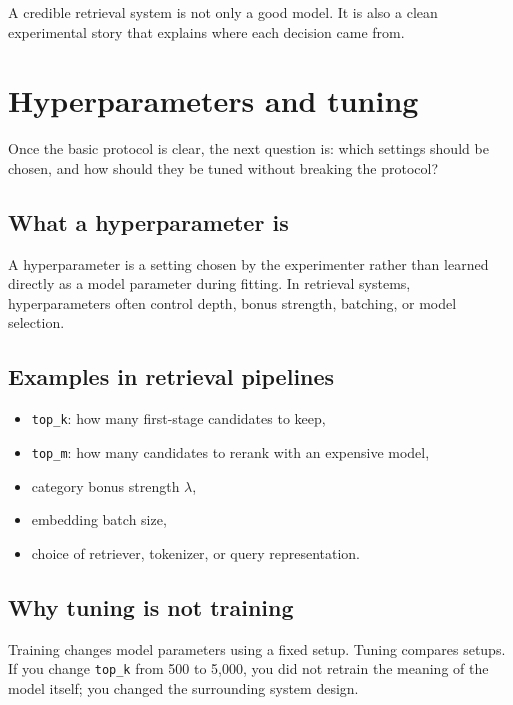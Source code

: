 \documentclass[11pt,oneside]{report}
\newcommand{\code}[1]{\texttt{#1}}
\begin{document}
\begin{rememberbox}
A credible retrieval system is not only a good model. It is also a clean experimental story that explains where each decision came from.
\end{rememberbox}


\chapter[Hyperparameters and Tuning]{Hyperparameters and tuning}

\begin{purposebox}
Once the basic protocol is clear, the next question is: which settings should be chosen, and how should they be tuned without breaking the protocol?
\end{purposebox}

\section*{What a hyperparameter is}
A hyperparameter is a setting chosen by the experimenter rather than learned directly as a model parameter during fitting. In retrieval systems, hyperparameters often control depth, bonus strength, batching, or model selection.

\section*{Examples in retrieval pipelines}
\begin{itemize}
\item \code{top\_k}: how many first-stage candidates to keep,
\item \code{top\_m}: how many candidates to rerank with an expensive model,
\item category bonus strength $\lambda$,
\item embedding batch size,
\item choice of retriever, tokenizer, or query representation.
\end{itemize}

\section*{Why tuning is not training}
Training changes model parameters using a fixed setup. Tuning compares setups. If you change \code{top\_k} from 500 to 5{,}000, you did not retrain the meaning of the model itself; you changed the surrounding system design.
\end{document}
